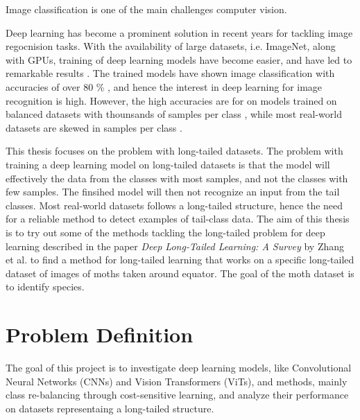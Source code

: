 

\label{sec:introduction}


Image classification is one of the main challenges computer vision.

Deep learning has become a prominent solution in recent years for tackling image regocnision tasks. With the availability of large datasets, i.e. ImageNet, along with GPUs, training of deep learning models have become easier, and have led to remarkable results . The trained models have shown image classification with accuracies of over 80 \% , and hence the interest in deep learning for image recognition is high. However, the high accuracies are for on models trained on balanced datasets with thounsands of samples per class , while most real-world datasets are skewed in samples per class .  


This thesis focuses on the problem with long-tailed datasets. The problem with training a deep learning model on long-tailed datasets is that the model will effectively the data from the classes with most samples, and not the classes with few samples. The finsihed model will then not recognize an input from the tail classes. Most real-world datasets follows a long-tailed structure, hence the need for a reliable method to detect examples of tail-class data. The aim of this thesis is to try out some of the methods tackling the long-tailed problem for deep learning described in the paper \textit{Deep Long-Tailed Learning: A Survey} by Zhang et al.\cite{zhang2023deep} to find a method for long-tailed learning that works on a specific long-tailed dataset of images of moths taken around equator. The goal of the moth dataset is to identify species.

\section{Problem Definition}


The goal of this project is to investigate deep learning models, like Convolutional Neural Networks (CNNs) and Vision Transformers (ViTs), and methods, mainly class re-balancing through cost-sensitive learning, and analyze their performance on datasets representaing a long-tailed structure.  

